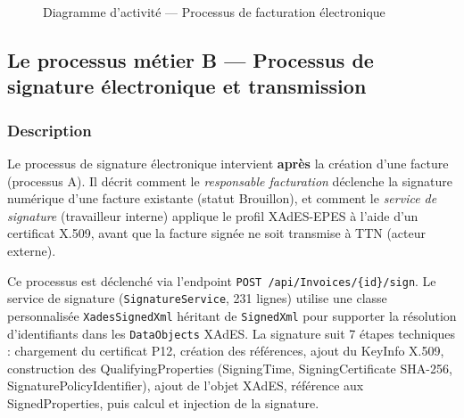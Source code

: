 \documentclass[a4paper,12pt]{report}
\begin{document}
\begin{figure}[htbp]
\caption{Diagramme d'activité — Processus de facturation électronique}
\label{fig:act_facturation}
\end{figure}


\subsection{Le processus métier B — Processus de signature électronique et transmission}

\subsubsection*{Description}

Le processus de signature électronique intervient \textbf{après} la création d'une facture (processus A). Il décrit comment le \textit{responsable facturation} déclenche la signature numérique d'une facture existante (statut \og{}Brouillon\fg{}), et comment le \textit{service de signature} (travailleur interne) applique le profil XAdES-EPES à l'aide d'un certificat X.509, avant que la facture signée ne soit transmise à TTN (acteur externe).

Ce processus est déclenché via l'endpoint \texttt{POST /api/Invoices/\{id\}/sign}. Le service de signature (\texttt{SignatureService}, 231 lignes) utilise une classe personnalisée \texttt{XadesSignedXml} héritant de \texttt{SignedXml} pour supporter la résolution d'identifiants dans les \texttt{DataObjects} XAdES. La signature suit 7 étapes techniques : chargement du certificat P12, création des références, ajout du KeyInfo X.509, construction des QualifyingProperties (SigningTime, SigningCertificate SHA-256, SignaturePolicyIdentifier), ajout de l'objet XAdES, référence aux SignedProperties, puis calcul et injection de la signature.
\end{document}
